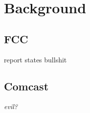 \section{Background}
\label{sec:background}


\subsection{FCC}
report states \cite{fcc2014measuring-broadband} bullshit  

\subsection{Comcast}
\em{evil?}